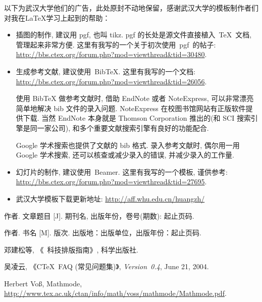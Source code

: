 \documentclass[forprint]{CSUBachelor}
\begin{document}
\vspace{1em}
以下为武汉大学他们的广告，此处原封不动地保留，感谢武汉大学的模板制作者们对我在\LaTeX{}学习上起到的帮助：
\begin{itemize}
    \item 插图的制作, 建议用 pgf, 也叫 tikz.
          pgf 的长处是源文件直接植入~\TeX~文档, 管理起来非常方便.
    这里有我写的一个关于初次使用~pgf~的帖子:\\    \url{http://bbs.ctex.org/forum.php?mod=viewthread&tid=30480}.
    \item 生成参考文献, 建议使用~BibTeX. 这里有我写的一个文档: \\
    \url{http://bbs.ctex.org/forum.php?mod=viewthread&tid=26056}.

          {\kaishu 使用 BibTeX{} 做参考文献时,
      借助 EndNote 或者 NoteExpress, 可以非常漂亮简单地解决 bib 文件的录入问题.
      NoteExpress 在校图书馆网站有正版软件提供下载.
      当然 EndNote 本身就是 Thomson Corporation 推出的(和 SCI 搜索引擎是同一家公司),
      和多个重要文献搜索引擎有良好的功能配合.

      Google 学术搜索也提供了文献的 bib 格式.
      录入参考文献时, 偶尔用一用 Google 学术搜索, 还可以核查或减少录入的错误, 并减少录入的工作量.}

    \item 幻灯片的制作, 建议使用~Beamer. 这里有我写的一个模板, 谨供参考:\\
    \url{http://bbs.ctex.org/forum.php?mod=viewthread&tid=27695}.
    
     \item 武汉大学模板下载更新地址:
  \url{http://aff.whu.edu.cn/huangzh/}
\end{itemize}



\cleardoublepage{}
{}
\wuhao\kaishu
\begin{thebibliography}{00}

   作者. 文章题目 [J].  期刊名, 出版年份，卷号(期数): 起止页码.

   作者. 书名 [M]. 版次. 出版地：出版单位，出版年份：起止页码.

   邓建松等, 《\LaTeXe~科技排版指南》, 科学出版社.

   吴凌云, 《CTeX~FAQ (常见问题集)》, \textit{Version~0.4}, June 21, 2004.

   Herbert Vo\ss, Mathmode, \url{http://www.tex.ac.uk/ctan/info/math/voss/mathmode/Mathmode.pdf}.

\end{thebibliography}
\end{document}
